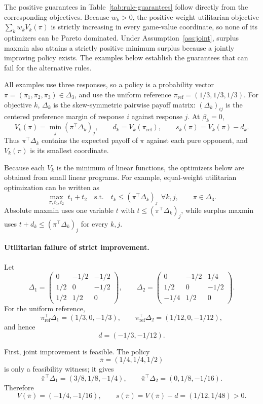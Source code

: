 \documentclass{article}
\theoremstyle{remark}
\theoremstyle{plain}
\newcommand{\piref}{\pi_{\mathrm{ref}}}
\begin{document}
The positive guarantees in Table~\ref{tab:rule-guarantees} follow
directly from the corresponding objectives. Because $w_k>0$, the
positive-weight utilitarian objective $\sum_k w_k V_k(\pi)$ is strictly
increasing in every game-value coordinate, so none of its optimizers can
be Pareto dominated. Under Assumption~\ref{ass:joint}, surplus maxmin
also attains a strictly positive minimum surplus because a jointly
improving policy exists. The examples below establish the guarantees
that can fail for the alternative rules.

All examples use three responses, so a policy is a probability vector
$\pi=(\pi_1,\pi_2,\pi_3)\in\Delta_3$, and use the uniform reference
$\piref=(1/3,1/3,1/3)$. For objective $k$, $\Delta_k$ is the skew-symmetric
pairwise payoff matrix: $(\Delta_k)_{ij}$ is the centered preference margin of response
$i$ against response $j$. At $\beta_k=0$,
\[
V_k(\pi)
=
\min_j(\pi^\top \Delta_k)_j,
\qquad
d_k=V_k(\piref),
\qquad
s_k(\pi)=V_k(\pi)-d_k.
\]
Thus $\pi^\top \Delta_k$ contains the expected payoff of $\pi$ against each
pure opponent, and $V_k(\pi)$ is its smallest coordinate.

Because each $V_k$ is the minimum of linear functions, the optimizers
below are obtained from small linear programs. For example,
equal-weight utilitarian optimization can be written as
\[
\max_{\pi,t_1,t_2}\ t_1+t_2
\quad\text{s.t.}\quad
t_k\le(\pi^\top \Delta_k)_j
\ \ \forall k,j,\qquad
\pi\in\Delta_3.
\]
Absolute maxmin uses one variable $t$ with
$t\le(\pi^\top \Delta_k)_j$, while surplus maxmin uses
$t+d_k\le(\pi^\top \Delta_k)_j$ for every $k,j$.

\paragraph{Utilitarian failure of strict improvement.}
Let
\[
\Delta_1=
\begin{pmatrix}
0&-1/2&-1/2\\
1/2&0&-1/2\\
1/2&1/2&0
\end{pmatrix},
\qquad
\Delta_2=
\begin{pmatrix}
0&-1/2&1/4\\
1/2&0&-1/2\\
-1/4&1/2&0
\end{pmatrix}.
\]
For the uniform reference,
\[
\piref^\top \Delta_1=(1/3,0,-1/3),
\qquad
\piref^\top \Delta_2=(1/12,0,-1/12),
\]
and hence
\[
d=(-1/3,-1/12).
\]

First, joint improvement is feasible. The policy
\[
\bar\pi=(1/4,1/4,1/2)
\]
is only a feasibility witness; it gives
\[
\bar\pi^\top \Delta_1=(3/8,1/8,-1/4),
\qquad
\bar\pi^\top \Delta_2=(0,1/8,-1/16).
\]
Therefore
\[
V(\bar\pi)=(-1/4,-1/16),
\qquad
s(\bar\pi)
=
V(\bar\pi)-d
=
(1/12,1/48)>0.
\]
\end{document}
